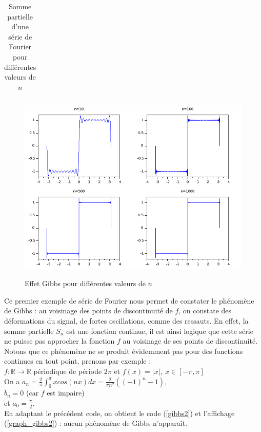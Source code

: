 \documentclass[a4paper,10pt]{report}
\begin{document}
\begin{table}[H]
\caption{Somme partielle d'une série de Fourier pour différentes valeurs de $n$}
\begin{tabular}{l}

\label{gibbs}
\end{tabular}
\end{table}

\begin{figure}[H]
\centering
\caption{Effet Gibbs pour différentes valeurs de $n$}
\includegraphics[width=\textwidth]{gibbs.png}
\label{graph_gibbs}
\end{figure}

Ce premier exemple de série de Fourier nous permet de constater le phénomène de Gibbs : au voisinage des points de discontinuité de $f$, on constate des déformations du signal, de fortes oscillations, comme des ressauts. En effet, la somme partielle $S_n$ est une fonction continue, il est ainsi logique que cette série ne puisse pas approcher la fonction $f$ au voisinage de ses points de discontinuité.\\

Notons que ce phénomène ne se produit évidemment pas pour des fonctions continues en tout point, prenons par exemple :\\
$f:\mathbb{R}\longrightarrow \mathbb{R}$ périodique de période $2\pi$ et $f(x)=|x|,\ x \in [-\pi,\pi]$\\
On a $a_n=\frac{2}{\pi} \int_{0}^{\pi}xcos(nx) dx=\frac{2}{\pi n^2}((-1)^n-1)$,\\
$b_n=0$ (car $f$ est impaire)\\
et $a_0=\frac{\pi}{2}$.\\
En adaptant le précédent code, on obtient le code (\ref{gibbs2}) et l'affichage (\ref{graph_gibbs2}) : aucun phénomène de Gibbs n'apparaît.
\end{document}
